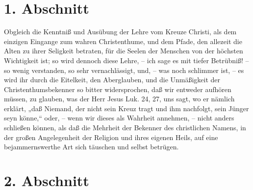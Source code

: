 \section{1. Abschnitt}

Obgleich die Kenntniß und Ausübung der Lehre vom Kreuze Christi, als dem einzigen Eingange zum wahren Christenthume, und dem Pfade, den allezeit die Alten zu ihrer Seligkeit betraten, für die Seelen der Menschen von der höchsten Wichtigkeit ist; so wird dennoch diese Lehre, – ich sage es mit tiefer Betrübniß! – so wenig verstanden, so sehr vernachlässigt, und, – was noch schlimmer ist, – es wird ihr durch die Eitelkeit, den Aberglauben, und die Unmäßigkeit der Christenthumsbekenner so bitter widersprochen, daß wir entweder aufhören müssen, zu glauben, was der Herr Jesus Luk. 24, 27, uns sagt, wo er nämlich erklärt, „daß Niemand, der nicht sein Kreuz tragt und ihm nachfolgt, sein Jünger seyn könne,“ oder, – wenn wir dieses als Wahrheit annehmen, – nicht anders schließen können, als daß die Mehrheit der Bekenner des christlichen Namens, in der großen Angelegenheit der Religion und ihres eigenen Heils, auf eine bejammernswerthe Art sich täuschen und selbst betrügen. 

\section{2. Abschnitt}

